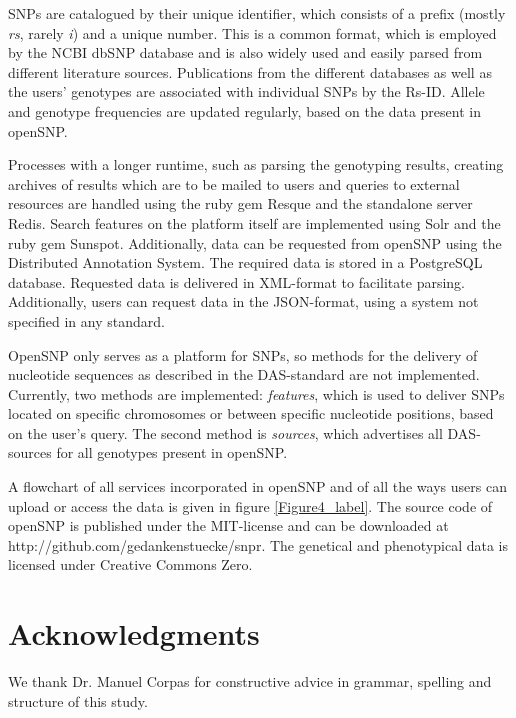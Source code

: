 \documentclass[10pt]{article}
\begin{document}
SNPs are catalogued by their unique identifier, which consists of a prefix (mostly \textit{rs}, rarely \textit{i}) and a unique number. This is a common format, 
which is employed by the NCBI dbSNP database \cite{Sherry2001} and is also widely used and easily parsed from different literature sources. Publications from the different databases as 
well as the users' genotypes are associated with individual SNPs by the Rs-ID. Allele and genotype frequencies are updated regularly, based on the data present in openSNP. 

Processes with a longer runtime, such as parsing the genotyping results, creating archives of results which are to be mailed to users and queries to external resources 
are handled using the ruby gem Resque and the standalone server Redis. Search features on the platform itself are implemented using Solr and the ruby gem Sunspot. 
Additionally, data can be requested from openSNP using the Distributed Annotation System. The required data is stored in a PostgreSQL database.  
Requested data is delivered in XML-format to facilitate parsing. Additionally, users can request data in the JSON-format, using a system not specified in any standard.

OpenSNP only serves as a platform for SNPs, so methods for the delivery of nucleotide sequences as described in the DAS-standard are not implemented. Currently, 
two methods are implemented: \textit{features}, which is used to deliver SNPs located on specific chromosomes or between specific nucleotide positions, 
based on the user's query. The second method is \textit{sources}, which advertises all DAS-sources for all genotypes present in openSNP.

A flowchart of all services incorporated in openSNP and of all the ways users can upload or access the data is given in figure \ref{Figure4_label}. The source code of openSNP is 
published under the MIT-license and can be downloaded at http://github.com/gedankenstuecke/snpr. The genetical and phenotypical data is licensed under Creative Commons Zero. 
\section*{Acknowledgments}
We thank Dr. Manuel Corpas for constructive advice in grammar, spelling and structure of this study.


\end{document}
